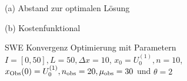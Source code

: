 \begin{figure}[H]
\centering
\begin{minipage}[b]{0.49\linewidth}
 \centering

\caption*{(a) Abstand zur optimalen Lösung}
\end{minipage}
\begin{minipage}[b]{0.49\linewidth}
 \centering

\caption*{(b) Kostenfunktional}
\end{minipage}
\caption{SWE Konvergenz Optimierung mit Parametern $I=[0,50],L=50,\Delta x=10$, $x_0=U_0^{(1)},n=10$, $x_{\text{Obs}}(0) = U_0^{(1)}, n_{\text{obs}}=20,\mu_{\text{obs}}=30$ und $\theta=2$}
\label{fig:sweConvergenceOpt}
\end{figure}


